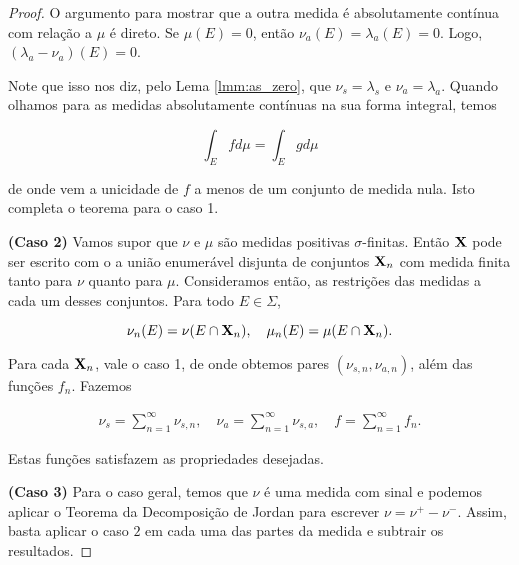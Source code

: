 \begin{proof}
    O argumento para mostrar que a outra medida é absolutamente contínua com relação a $\mu$ é direto. Se $\mu(E)=0$, então $\nu_a(E)=\lambda_a(E)=0$. Logo, $(\lambda_a-\nu_a)(E)=0$.

    Note que isso nos diz, pelo Lema \ref{lmm:as_zero}, que $\nu_s=\lambda_s$ e $\nu_a=\lambda_a$. Quando olhamos para as medidas absolutamente contínuas na sua forma integral, temos

    \begin{equation*}
        \int_{E} f d\mu = \int_{E} g d\mu
    \end{equation*}

    de onde vem a unicidade de $f$ a menos de um conjunto de medida nula. Isto completa o teorema para o caso 1.

    \textbf{(Caso 2)} Vamos supor que $\nu$ e $\mu$ são medidas positivas $\sigma$-finitas. Então $\mathbf{X}$ pode ser escrito com o a união enumerável disjunta de conjuntos $\mathbf{X}_n$ com medida finita tanto para $\nu$ quanto para $\mu$. Consideramos então, as restrições das medidas a cada um desses conjuntos. Para todo $E\in\Sigma$,

    \begin{equation*}
        \nu_n(E) = \nu(E\cap \mathbf{X}_n), \quad \mu_n(E) = \mu(E\cap \mathbf{X}_n).
    \end{equation*}

    Para cada $\mathbf{X}_n$, vale o caso 1, de onde obtemos pares $(\nu_{s,n}, \nu_{a,n})$, além das funções $f_n$. Fazemos

    \begin{eqnarray*}
        \nu_s = \sum_{n=1}^{\infty} \nu_{s,n}, \quad \nu_a = \sum_{n=1}^{\infty} \nu_{s,a}, \quad  f = \sum_{n=1}^{\infty} f_n.
    \end{eqnarray*}

    Estas funções satisfazem as propriedades desejadas.

    \textbf{(Caso 3)} Para o caso geral, temos que $\nu$ é uma medida com sinal e podemos aplicar o Teorema da Decomposição de Jordan para escrever $\nu = \nu^{+} - \nu^{-}$. Assim, basta aplicar o caso $2$ em cada uma das partes da medida e subtrair os resultados. 
    
\end{proof}
